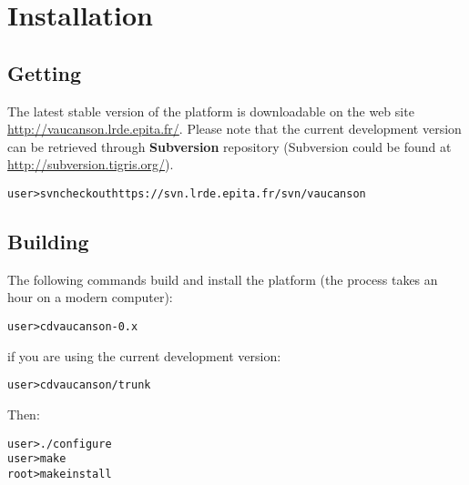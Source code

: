 \chapter{Installation}

\section{Getting \Vauc}

The latest stable version of the \Vauc platform is downloadable on the
web site \url{http://vaucanson.lrde.epita.fr/}. Please note that the
current development version can be retrieved through
\textbf{Subversion} repository (Subversion could be found at
\url{http://subversion.tigris.org/}).

\begin{alltt}
user> svn checkout https://svn.lrde.epita.fr/svn/vaucanson
\end{alltt}

\section{Building \Vauc}
The following commands build and install the platform (the process
takes an hour on a modern computer):
\begin{alltt}
user> cd vaucanson-0.x
\end{alltt}
if you are using the current development version:
\begin{alltt}
user> cd vaucanson/trunk
\end{alltt}
Then:
\begin{alltt}
user> ./configure
user> make
root> make install
\end{alltt}
